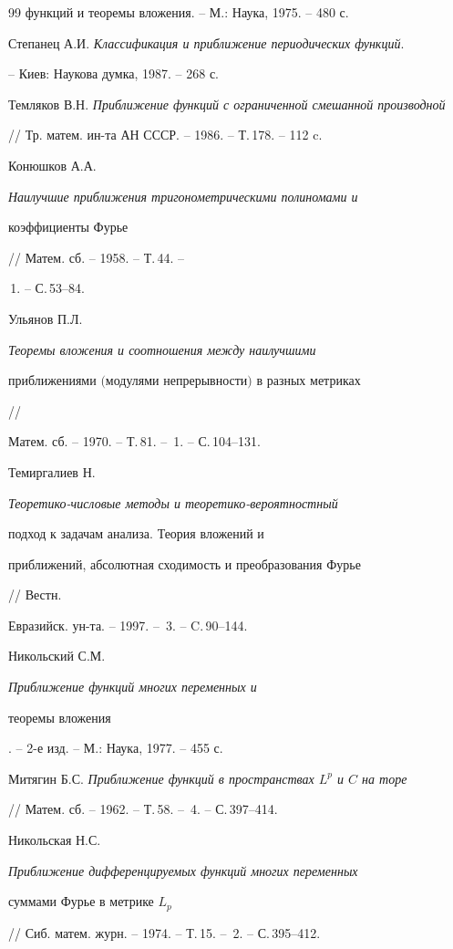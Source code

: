 \begin{thebibliography}{99}
{функций и теоремы вложения}. -- М.: Наука, 1975. -- 480 с.




Степанец А.И. {\em Классификация и приближение периодических функций}.


-- Киев: Наукова думка, 1987. -- 268 с.




Темляков В.Н. {\em Приближение функций с ограниченной смешанной производной}


// Тр. матем. ин-та АН СССР. -- 1986. -- Т.\,178. -- 112 c.




Конюшков А.А. {\em Наилучшие приближения тригонометрическими полиномами и 


коэффициенты Фурье} // Матем. сб. -- 1958. -- Т.\,44. --


\No\,1. -- С.\,53--84.




Ульянов П.Л. {\em Теоремы вложения и соотношения между наилучшими 


приближениями $($модулями непрерывности$)$ в разных метриках} //


Матем. сб. -- 1970. -- Т.\,81. -- \No\,1. -- С.\,104--131.




Темиргалиев Н. {\em Теоретико-числовые методы и теоретико-вероятностный 


подход к задачам анализа. Теория вложений и 


приближений, абсолютная сходимость и преобразования Фурье} // Вестн. 


Евразийск. ун-та. -- 1997. -- \No\,3. -- C.\,90--144.




Никольский С.М. {\em Приближение функций многих переменных и 


теоремы вложения}. -- 2-е изд. -- М.: Наука, 1977. -- 455 с.




Митягин Б.С. {\em Приближение функций в пространствах $L^p$ и $C$ на торе} 


// Матем. сб. -- 1962. -- Т.\,58. -- \No\,4. -- С.\,397--414.




Никольская Н.С. {\em Приближение дифференцируемых функций многих переменных


суммами Фурье в метрике $L_p$} 


// Сиб. матем. журн. -- 1974. -- Т.\,15. -- \No\,2. -- С.\,395--412.



\end{thebibliography}
